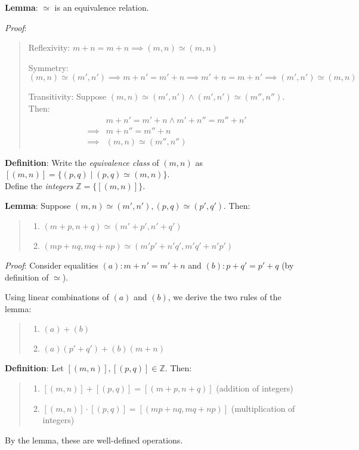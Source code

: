\documentclass[11pt]{article}
\begin{document}
\textbf{Lemma}: $\simeq$ is an equivalence relation.

\emph{Proof}:
\begin{quote}\vspace{-1cm}
	\item Reflexivity: $m + n = m + n \implies (m,n) \simeq (m,n)$
	\item Symmetry: $(m,n) \simeq (m', n') \implies m + n' = m' + n \implies m' + n = m + n' \implies (m', n') \simeq (m, n)$
	\item Transitivity: Suppose $(m,n) \simeq (m', n') \land (m', n') \simeq (m'', n'')$. Then:
	\begin{align*}
		& m+n' = m' + n \land m' + n'' = m'' + n'\\
		\implies & m + n'' = m'' + n\\
		\implies & (m,n) \simeq (m'',n'')
	\end{align*}
\end{quote}

\textbf{Definition}: Write the \emph{equivalence class} of $(m,n)$ as $[(m,n)] = \{(p,q) \mid (p,q) \simeq (m,n)\}$.\\
Define the \emph{integers} $\mathbb{Z} = \{[(m,n)]\}$.

\textbf{Lemma}: Suppose $(m,n) \simeq (m', n'), (p,q) \simeq (p',q')$. Then:
\begin{quote}\vspace{-0.3cm}
	\begin{enumerate}
	\item $(m+p, n+q) \simeq (m'+p', n'+q')$
	\item $(mp+nq, mq+np) \simeq (m'p'+n'q', m'q'+n'p')$
	\end{enumerate}
\end{quote}

\emph{Proof}: Consider equalities $(a): m+n' = m'+n$ and $(b): p+q' = p'+q$ (by definition of $\simeq$).

Using linear combinations of $(a)$ and $(b)$, we derive the two rules of the lemma:
\begin{quote}\vspace{-0.3cm}
	\begin{enumerate}
	\item $(a) + (b)$
	\item $(a)(p' + q') + (b)(m + n)$
	\end{enumerate}
\end{quote}

\textbf{Definition}: Let $[(m,n)], [(p,q)] \in \mathbb{Z}$. Then:
\begin{quote}\vspace{-0.3cm}
	\begin{enumerate}
	\item $[(m,n)] + [(p,q)] = [(m+p, n+q)]$ (addition of integers)
	\item $[(m,n)] \cdot [(p,q)] = [(mp+nq, mq+np)]$ (multiplication of integers)
	\end{enumerate}
\end{quote}
By the lemma, these are well-defined operations.
\end{document}

